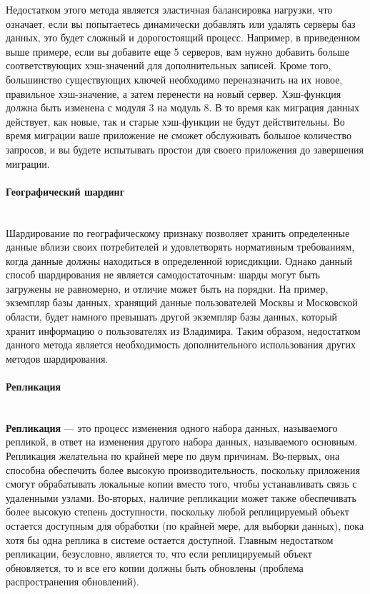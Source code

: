 Недостатком этого метода является эластичная балансировка нагрузки, что означает, если вы попытаетесь динамически
добавлять или удалять серверы баз данных, это будет сложный и дорогостоящий процесс. Например, в приведенном выше
примере, если вы добавите еще 5 серверов, вам нужно добавить больше соответствующих хэш-значений для дополнительных
записей. Кроме того, большинство существующих ключей необходимо переназначить на их новое, правильное хэш-значение,
а затем перенести на новый сервер. Хэш-функция должна быть изменена с модуля 3 на модуль 8. В то время как миграция
данных действует, как новые, так и старые хэш-функции не будут действительны. Во время миграции ваше приложение не
сможет обслуживать большое количество запросов, и вы будете испытывать простои для своего приложения до завершения
миграции. \autocite{DatabaseSharding}

\paragraph{Географический шардинг} ~\\
Шардирование по географическому признаку позволяет хранить определенные данные вблизи своих потребителей и
удовлетворять нормативным требованиям, когда данные должны находиться в определенной юрисдикции. Однако данный способ
шардирования не является самодостаточным: шарды могут быть загружены не равномерно, и отличие может быть на порядки.
На пример, экземпляр базы данных, хранящий данные пользователей Москвы и Московской области, будет намного превышать
другой экземпляр базы данных, который хранит информацию о пользователях из Владимира. Таким образом, недостатком
данного метода является необходимость дополнительного использования других методов шардирования.

\paragraph{Репликация} ~\\
\textbf{Репликация} — это процесс изменения одного набора данных, называемого репликой, в ответ на изменения другого
набора данных, называемого основным. Репликация желательна по крайней мере по двум причинам. Во-первых, она способна
обеспечить более высокую производительность, поскольку приложения смогут обрабатывать локальные копии вместо того,
чтобы устанавливать связь с удаленными узлами. Во-вторых, наличие репликации может также обеспечивать более высокую
степень доступности, поскольку любой реплицируемый объект остается доступным для обработки (по крайней мере, для выборки
данных), пока хотя бы одна реплика в системе остается доступной. Главным недостатком репликации, безусловно, является
то, что если реплицируемый объект обновляется, то и все его копии должны быть обновлены (проблема распространения
обновлений).

